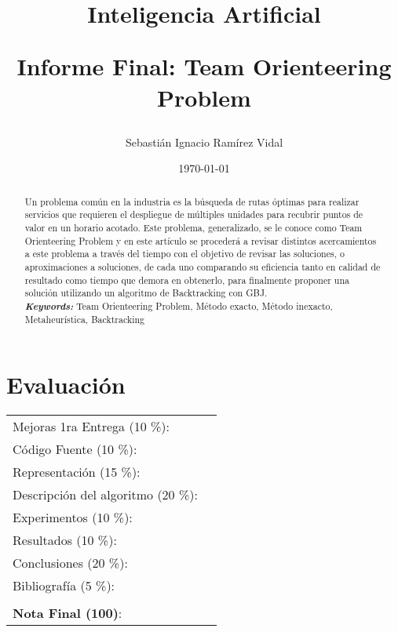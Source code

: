\documentclass[letter, 10pt]{article}
\providecommand{\keywords}[1]
{
  \small	
  \textbf{\textit{Keywords:}} #1
}
\begin{document}
\title{Inteligencia Artificial \\ \begin{Large}Informe Final: Team Orienteering Problem\end{Large}}
\author{Sebasti\'an Ignacio Ram\'irez Vidal}
\date{\today}
\maketitle


\section*{Evaluaci\'on}

\begin{tabular}{ll}
Mejoras 1ra Entrega (10 \%): &  \underline{\hspace{2cm}}\\
C\'odigo Fuente (10 \%): &  \underline{\hspace{2cm}}\\
Representaci\'on (15 \%):  & \underline{\hspace{2cm}} \\
Descripci\'on del algoritmo (20 \%):  & \underline{\hspace{2cm}} \\
Experimentos (10 \%):  & \underline{\hspace{2cm}} \\
Resultados (10 \%):  & \underline{\hspace{2cm}} \\
Conclusiones (20 \%): &  \underline{\hspace{2cm}}\\
Bibliograf\'ia (5 \%): & \underline{\hspace{2cm}}\\
 &  \\
\textbf{Nota Final (100)}:   & \underline{\hspace{2cm}}
\end{tabular}

\vspace{2cm}


\begin{abstract}
Un problema com\'un en la industria es la b\'usqueda de rutas \'optimas para realizar servicios que requieren el despliegue de m\'ultiples unidades para recubrir puntos de valor en un horario acotado. Este problema, generalizado, se le conoce como Team Orienteering Problem y en este art\'iculo se proceder\'a a revisar distintos acercamientos a este problema a trav\'es del tiempo con el objetivo de revisar las soluciones, o aproximaciones a soluciones, de cada uno comparando su eficiencia tanto en calidad de resultado como tiempo que demora en obtenerlo, para finalmente proponer una soluci\'on utilizando un algoritmo de Backtracking con GBJ.\\
\keywords{Team Orienteering Problem, M\'etodo exacto, M\'etodo inexacto, Metaheur\'istica, Backtracking}
\end{abstract}
\end{document}
